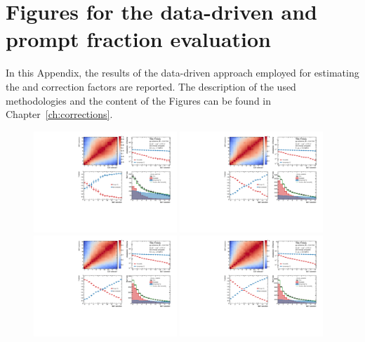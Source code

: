 \chapter[Figures for the data-driven \ds and \dpl prompt fraction evaluation]{\texorpdfstring{Figures for the data-driven \ds and\\ \dpl prompt fraction evaluation}{Figures for the data-driven Ds+ and D+ prompt fraction evaluation}}\label{app:fpds}
In this Appendix, the results of the data-driven approach employed for estimating the \fpds and \fpdpl correction factors are reported. The description of the used methodologies and the content of the Figures can be found in Chapter~\ref{ch:corrections}.

\begin{figure}
    \centering
    \includegraphics[width=0.48\textwidth]{Figures/Chapter 6/AllPropmtFracs/Ds/DsPromptFrac5_10.pdf}
    \includegraphics[width=0.48\textwidth]{Figures/Chapter 6/AllPropmtFracs/Ds/DsPromptFrac10_15.pdf}
    \includegraphics[width=0.48\textwidth]{Figures/Chapter 6/AllPropmtFracs/Ds/DsPromptFrac15_20.pdf}
    \includegraphics[width=0.48\textwidth]{Figures/Chapter 6/AllPropmtFracs/Ds/DsPromptFrac20_25.pdf}

\end{figure}

